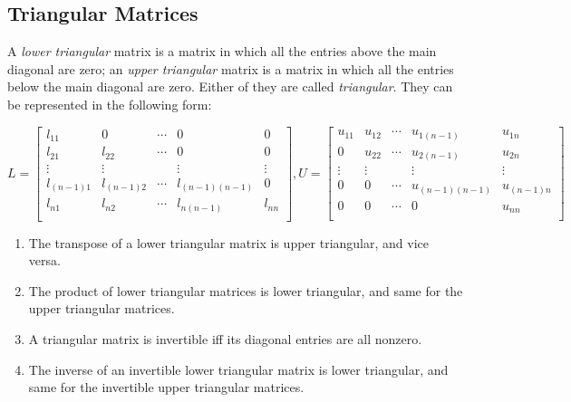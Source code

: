 \documentclass{report}
\begin{document}
		\subsection{Triangular Matrices}
		A \emph{lower triangular} matrix is a matrix in which all the entries above the main diagonal are zero; an \emph{upper triangular} matrix is a matrix in which all the entries below the main diagonal are zero. Either of they are called \emph{triangular}. They can be represented in the following form:
		
		\begin{displaymath}
		L=
			\begin{bmatrix}
				l_{11}     & 0          & \cdots & 0              & 0      \\
				l_{21}     & l_{22}     & \cdots & 0              & 0      \\
				\vdots     & \vdots     &        & \vdots         & \vdots \\
				l_{(n-1)1} & l_{(n-1)2} & \cdots & l_{(n-1)(n-1)} & 0      \\
				l_{n1}     & l_{n2}     & \cdots & l_{n(n-1)}     & l_{nn} \\
			\end{bmatrix}
		, U=
			\begin{bmatrix}
				u_{11} & u_{12} & \cdots & u_{1(n-1)}     & u_{1n}     \\
				0      & u_{22} & \cdots & u_{2(n-1)}     & u_{2n}     \\
				\vdots & \vdots &        & \vdots         & \vdots     \\
				0      & 0      & \cdots & u_{(n-1)(n-1)} & u_{(n-1)n} \\
				0      & 0      & \cdots & 0              & u_{nn}     \\
			\end{bmatrix}
		\end{displaymath}
		
		\begin{thm}
			\begin{enumerate}
				\item The transpose of a lower triangular matrix is upper triangular, and vice versa.
				\item The product of lower triangular matrices is lower triangular, and same for the upper triangular matrices.
				\item A triangular matrix is invertible iff its diagonal entries are all nonzero.
				\item The inverse of an invertible lower triangular matrix is lower triangular, and same for the invertible upper triangular matrices.
			\end{enumerate}
		\end{thm}
		
\end{document}
